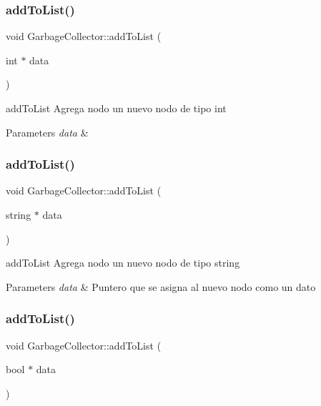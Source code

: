 \subsubsection{\texorpdfstring{add\+To\+List()}{addToList()}\hspace{0.1cm}{\footnotesize\ttfamily [1/3]}}
{\footnotesize\ttfamily void Garbage\+Collector\+::add\+To\+List (\begin{DoxyParamCaption}\item[{int $\ast$}]{data }\end{DoxyParamCaption})}



add\+To\+List Agrega nodo un nuevo nodo de tipo int 


\begin{DoxyParams}{Parameters}
{\em data} & \\
\hline
\end{DoxyParams}
\mbox{\label{class_garbage_collector_a49ac1532606dd88eb0f7505bc33cd967}} 
\subsubsection{\texorpdfstring{add\+To\+List()}{addToList()}\hspace{0.1cm}{\footnotesize\ttfamily [2/3]}}
{\footnotesize\ttfamily void Garbage\+Collector\+::add\+To\+List (\begin{DoxyParamCaption}\item[{string $\ast$}]{data }\end{DoxyParamCaption})}



add\+To\+List Agrega nodo un nuevo nodo de tipo string 


\begin{DoxyParams}{Parameters}
{\em data} & Puntero que se asigna al nuevo nodo como un dato \\
\hline
\end{DoxyParams}
\mbox{\label{class_garbage_collector_a5bacb8303b1daea1a260b8c2c0102615}} 
\subsubsection{\texorpdfstring{add\+To\+List()}{addToList()}\hspace{0.1cm}{\footnotesize\ttfamily [3/3]}}
{\footnotesize\ttfamily void Garbage\+Collector\+::add\+To\+List (\begin{DoxyParamCaption}\item[{bool $\ast$}]{data }\end{DoxyParamCaption})}



